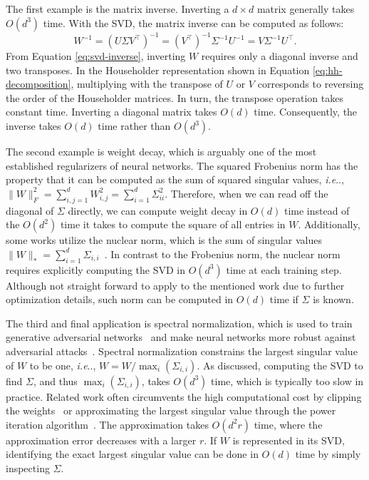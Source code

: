 \documentclass[11pt,a4paper,twoside,openright,final]{memoir}
\makeatletter
\DeclareRobustCommand\onedot{\futurelet\@let@token\@onedot}
\def\@onedot{\ifx\@let@token.\else.\null\fi\xspace}
\def\ie{\emph{i.e}\onedot} \def\Ie{\emph{I.e}\onedot}
\makeatother
\begin{document}
The first example is the matrix inverse. 
Inverting a $d\times d$ matrix generally takes $O(d^3)$ time.
With the SVD, the matrix inverse can be computed as follows:
\begin{equation}\label{eq:svd-inverse}
    W^{-1} = (U\Sigma V^\intercal)^{-1} = (V^\intercal)^{-1}\Sigma^{-1}U^{-1} = V \Sigma^{-1} U^\intercal.
\end{equation}
From Equation \eqref{eq:svd-inverse}, inverting $W$ requires only a diagonal inverse and two transposes.
In the Householder representation shown in Equation \eqref{eq:hh-decomposition}, multiplying with the transpose of $U$ or $V$ corresponds to reversing the order of the Householder matrices.
In turn, the transpose operation takes constant time. 
Inverting a diagonal matrix takes $O(d)$ time. 
Consequently, the inverse takes $O(d)$ time rather than $O(d^3)$.

The second example is weight decay, which is arguably one of the most established regularizers of neural networks.
The squared Frobenius norm has the property that it can be computed as the sum of squared singular values, \ie, $\|W\|_F^2 = \sum_{i,j=1}^d W_{i,j}^2 = \sum_{i=1}^d \Sigma_{ii}^2$.
Therefore, when we can read off the diagonal of $\Sigma$ directly, we can compute weight decay in $O(d)$ time instead of the $O(d^2)$ time it takes to compute the square of all entries in $W$.
Additionally, some works utilize the nuclear norm, which is the sum of singular values $\|W\|_\ast = \sum_{i=1}^d \Sigma_{i,i}$~\cite{nuclear-norm-regularizer, nuclear-norm-regularizer2}. 
In contrast to the Frobenius norm, the nuclear norm requires explicitly computing the SVD in $O(d^3)$ time at each training step.
Although not straight forward to apply to the mentioned work due to further optimization details, such norm can be computed in $O(d)$ time if $\Sigma$ is known.

The third and final application is spectral normalization, which is used to train generative adversarial networks~\cite{sngan, wgan} and make neural networks more robust against adversarial attacks~\cite{spectral-norm-robustness}. 
Spectral normalization constrains the largest singular value of $W$ to be one, \ie, $W = W / \max_{i}(\Sigma_{i,i})$. 
As discussed, computing the SVD to find $\Sigma$, and thus $\max_i(\Sigma_{i,i})$, takes $O(d^3)$ time, which is typically too slow in practice.
Related work often circumvents the high computational cost by clipping the weights~\cite{wgan} or approximating the largest singular value through the power iteration algorithm~\cite{sngan, spectral-norm-robustness}.
The approximation takes $O(d^2r)$ time, where the approximation error decreases with a larger $r$.
If $W$ is represented in its SVD, identifying the exact largest singular value can be done in $O(d)$ time by simply inspecting $\Sigma$. 
\end{document}
